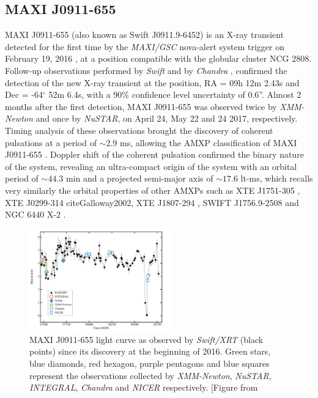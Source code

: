 \documentclass[graybox]{svmult}
\def \inte {{\em INTEGRAL\xspace}}
\def \swift {{\em Swift\xspace}}
\def \chandra {{\em Chandra\xspace}}
\def \xmm {{\em XMM-Newton\xspace}}
\def \swiftxrt{{\em Swift/XRT\xspace}}
\def \nustar{{\em NuSTAR\xspace}}
\def \nicer{{\em NICER\xspace}}
\def \maxigsc{{\em MAXI/GSC\xspace}}
\def \maxigsc{{\em MAXI/GSC\xspace}}
\begin{document}
\subsection{MAXI J0911-655}

MAXI J0911-655 (also known as Swift J0911.9-6452) is an X-ray transient detected for the first time by the \maxigsc{} nova-alert system trigger on February 19, 2016 \cite{Serino2016}, at a position compatible with the globular cluster NCG 2808. Follow-up observations performed by \swift{} and by \chandra{} \cite{Homan2016}, confirmed the detection of the new X-ray transient at the position, RA = 09h 12m 2.43s and Dec = -64$^\circ$ 52m 6.4s, with a 90\% confidence level uncertainty of 0.6''. 
Almost 2 months after the first detection, MAXI J0911-655 was observed twice by \xmm{} and once by \nustar{}, on April 24, May 22 and 24 2017, respectively. Timing analysis of these observations brought the discovery of coherent pulsations at a period of $\sim$2.9 ms, allowing the AMXP classification of MAXI J0911-655 \cite{Sanna2017a}. Doppler shift of the coherent pulsation confirmed the binary nature of the system, revealing an ultra-compact origin of the system with an orbital period of $\sim44.3$ min and a projected semi-major axis of $\sim17.6$ lt-ms, which recalls very similarly the orbital properties of other AMXPs such as XTE J1751-305 \cite{Markwardt2002,Papitto2008}, XTE J0299-314 
cite{Galloway2002}, XTE J1807-294 \cite{Kirsch2004,Riggio2008,Chou2008,Patruno2010b}, SWIFT J1756.9-2508 \cite{Krimm2007,Linares2008b,Patruno2010b} and NGC 6440 X-2 \cite{Altamirano2010b,Bult2015c}.

\begin{figure}
\centering
  \includegraphics[width=0.55\textwidth]{REVIEW_AMXP/lc_updated_maxi_0911.pdf}
  \caption{MAXI J0911-655 light curve as observed by \swiftxrt{} (black points) since its discovery at the beginning of 2016. Green stars, blue diamonds, red hexagon, purple pentagons and blue squares represent the observations collected by \xmm{}, \nustar{}, \inte{}, \chandra{} and \nicer{} respectively. [Figure from \cite{Sanna2017a}}     
  \label{fig:lc_0911}
\end{figure}
\end{document}
